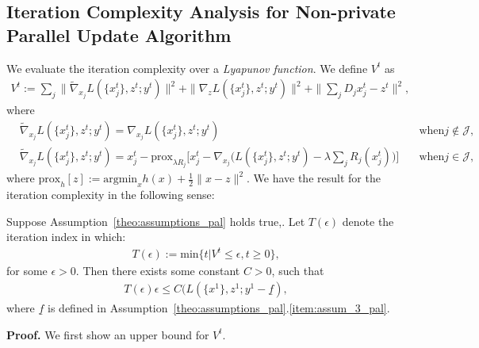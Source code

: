 \subsection{Iteration Complexity Analysis for Non-private Parallel Update Algorithm}
We evaluate the iteration complexity over a \emph{Lyapunov function}. We define $V^t$ as
\begin{align}
    V^t:=\sum_j \|\tilde{\nabla}_{x_j} L(\{x^t_j\}, z^t; y^t)\|^2 + \|\nabla_z L(\{x^t_j\}, z^t; y^t)\|^2 + \|\sum_j D_jx_j^t - z^t\|^2,\label{eq:Lyapunov}
\end{align}
where
\begin{align}
    & \tilde{\nabla}_{x_j} L(\{x^t_j\}, z^t; y^t) = \nabla_{x_j} L(\{x^t_j\}, z^t; y^t)\quad &\text{when} j\not\in\mathcal{J},\nonumber\\
    & \tilde{\nabla}_{x_j} L(\{x^t_j\}, z^t; y^t) = x_j^t - \text{prox}_{\lambda R_j} \big[x_j^t-\nabla_{x_j}\big(L(\{x^t_j\}, z^t; y^t) - \lambda\sum_j R_j(x_j^t)\big)\big] \quad &\text{when} j\in\mathcal{J},\nonumber
\end{align}
where $\text{prox}_h[z] := \text{argmin}_x h(x)+\frac{1}{2}\|x-z\|^2$.  We have the result for the iteration complexity in the following sense: 
\begin{theorem}\label{theo:iter_complexity}
    Suppose Assumption~\ref{theo:assumptions_pal} holds true,. Let $T(\epsilon)$ denote the iteration index in which:
    \begin{align}
        T(\epsilon):=\text{min}\{t|V^t\le\epsilon, t\ge0\},\nonumber
    \end{align}
    for some $\epsilon>0$. Then there exists some constant $C>0$, such that 
    \begin{align}
        T(\epsilon)\epsilon\le C(L(\{x^1\}, z^1; y^1 - \underline{f}),
    \end{align} 
    where $\underline{f}$ is defined in Assumption~\ref{theo:assumptions_pal}.\ref{item:assum_3_pal}.
\end{theorem}
{\bf Proof.} We first show an upper bound for $V^t$. 

